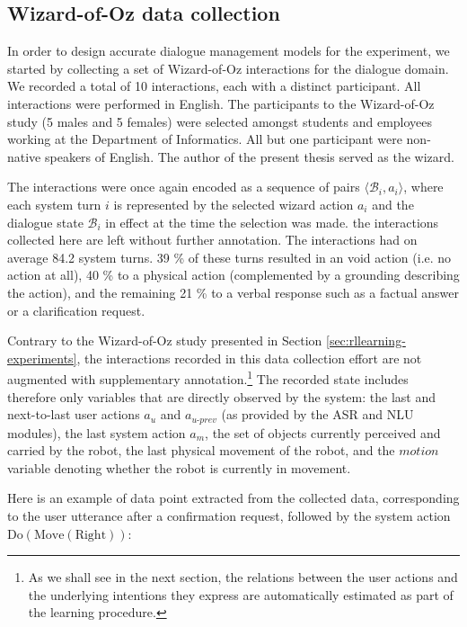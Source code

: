 \subsection{Wizard-of-Oz data collection}
\label{sec:wozcollection-exp3}

In order to design accurate dialogue management models for the experiment, we started by collecting a set of Wizard-of-Oz interactions for the dialogue domain. We recorded a total of 10 interactions, each with a distinct participant. All interactions were performed in English. The participants to the Wizard-of-Oz study (5 males and 5 females) were selected amongst students and employees working at the Department of Informatics. All but one participant were non-native speakers of English. The author of the present thesis served as the wizard.

The interactions were once again encoded as a sequence of pairs $\langle \mathcal{B}_i, a_i \rangle$, where each system turn $i$ is represented by the selected wizard action $a_i$ and the dialogue state $\mathcal{B}_i$ in effect at the time the selection was made. the interactions collected here are left without further annotation. The interactions had on average 84.2 system turns.  39 \% of these turns resulted in an void action (i.e. no action at all), 40 \% to a physical action (complemented by a grounding describing the action), and the remaining 21 \% to a verbal response such as a factual answer or a clarification request. 

Contrary to the Wizard-of-Oz study presented in Section \ref{sec:rllearning-experiments}, the interactions recorded in this data collection effort are not augmented with supplementary annotation.\footnote{As we shall see in the next section, the relations between the user actions and the underlying intentions they express are automatically estimated as part of the learning procedure.} The recorded state includes therefore only variables that are directly observed by the system: the last and next-to-last user actions $a_u$ and $a_{u\mbox{-}prev}$ (as provided by the ASR and NLU modules), the last system action $a_m$, the set of objects currently perceived and carried by the robot, the last physical movement of the robot, and the $\mathit{motion}$ variable denoting whether the robot is currently in movement. 

Here is an example of data point extracted from the collected data, corresponding to the user utterance  after a confirmation request, followed by the system action $\mathrm{Do(Move(Right))}$: 

